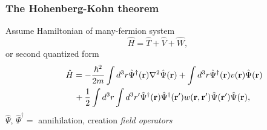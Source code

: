 \documentclass[compress]{beamer}
\begin{document}
\frame
{
  \frametitle{The Hohenberg-Kohn theorem}
{\scriptsize
Assume \alert{Hamiltonian} of many-fermion system
\[
\hat{H} = \hat{T}+\hat{V}+\hat{W},
\]
or second quantized form
\begin{eqnarray}
\lefteqn{ \hat{H} = -\frac{\hbar^{2}}{2m}\int d^{3}r\hat{\Psi}^{\dagger}(\mathbf{r})\nabla^{2}\hat{\Psi}(\mathbf{r})+\int d^{3}r\hat{\Psi}^{\dagger}(\mathbf{r})v(\mathbf{r})\hat{\Psi}(\mathbf{r}) } \nonumber\\
& & {}+\frac{1}{2}\int d^{3}r\int d^{3}r'\hat{\Psi}^{\dagger}(\mathbf{r})\hat{\Psi}^{\dagger}(\mathbf{r'}) w(\mathbf{r},\mathbf{r'})\hat{\Psi}(\mathbf{r'})\hat{\Psi}(\mathbf{r}),\nonumber
\end{eqnarray}
$\hat{\Psi}$, $\hat{\Psi}^{\dagger } =$ annihilation, creation \emph{field operators}
}
}
\end{document}
